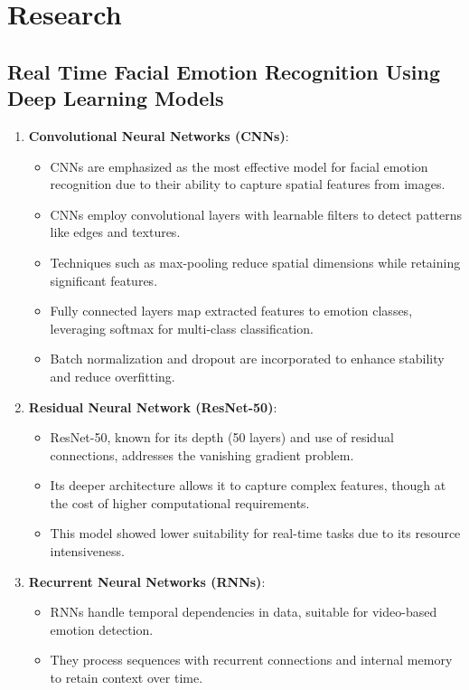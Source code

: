 \documentclass{article}
\begin{document}
\section*{Research}

\subsection{Real Time Facial Emotion Recognition Using Deep Learning Models}
\begin{enumerate}
    \item \textbf{Convolutional Neural Networks (CNNs)}:
    \begin{itemize}
        \item CNNs are emphasized as the most effective model for facial emotion recognition due to their ability to capture spatial features from images.
        \item CNNs employ convolutional layers with learnable filters to detect patterns like edges and textures.
        \item Techniques such as max-pooling reduce spatial dimensions while retaining significant features.
        \item Fully connected layers map extracted features to emotion classes, leveraging softmax for multi-class classification.
        \item Batch normalization and dropout are incorporated to enhance stability and reduce overfitting.
    \end{itemize}
    \item \textbf{Residual Neural Network (ResNet-50)}:
    \begin{itemize}
        \item ResNet-50, known for its depth (50 layers) and use of residual connections, addresses the vanishing gradient problem.
        \item Its deeper architecture allows it to capture complex features, though at the cost of higher computational requirements.
        \item This model showed lower suitability for real-time tasks due to its resource intensiveness.
    \end{itemize}
    \item \textbf{Recurrent Neural Networks (RNNs)}:
    \begin{itemize}
        \item RNNs handle temporal dependencies in data, suitable for video-based emotion detection.
        \item They process sequences with recurrent connections and internal memory to retain context over time.

\end{itemize}
\end{enumerate}
\end{document}
